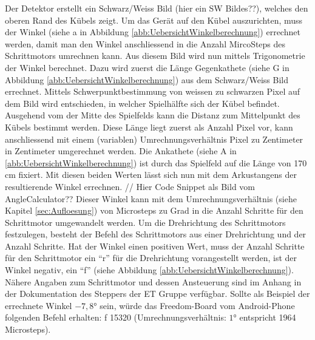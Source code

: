 Der Detektor erstellt ein Schwarz/Weiss Bild (hier ein SW Bildes??), welches den oberen Rand des Kübels zeigt. 
Um das Gerät auf den Kübel auszurichten, muss der Winkel (siehe a in Abbildung \ref{abb:UebersichtWinkelberechnung}) errechnet werden, 
damit man den Winkel anschliessend in die Anzahl MircoSteps des Schrittmotors umrechnen kann.
\newline
\newline
Aus diesem Bild wird nun mittels Trigonometrie der Winkel berechnet. 
Dazu wird zuerst die Länge Gegenkathete (siehe G in Abbildung \ref{abb:UebersichtWinkelberechnung}) 
aus dem Schwarz/Weiss Bild errechnet. Mittels Schwerpunktbestimmung von weissen zu schwarzen Pixel auf dem Bild wird entschieden, 
in welcher Spielhälfte sich der Kübel befindet. Ausgehend vom der Mitte des Spielfelds kann die Distanz zum Mittelpunkt des 
Kübels bestimmt werden. Diese Länge liegt zuerst als Anzahl Pixel vor, 
  kann anschliessend mit einem (variablen) Umrechnungsverhältnis Pixel zu Zentimeter in Zentimeter umgerechnet werden.
Die Ankathete (siehe A in \ref{abb:UebersichtWinkelberechnung}) ist durch das Spielfeld auf die Länge von 170 cm fixiert. 
Mit diesen beiden Werten lässt sich nun mit dem Arkustangens der resultierende Winkel errechnen.
\newline
\newline
// Hier Code Snippet als Bild vom AngleCalculator??
\newline
\newline
Dieser Winkel kann mit dem Umrechnungsverhältnis (siehe Kapitel \ref{sec:Aufloesung}) von Microsteps zu Grad 
in die Anzahl Schritte für den Schrittmotor umgewandelt werden. Um die Drehrichtung des Schrittmotors festzulegen, besteht der 
Befehl des Schrittmotors aus einer Drehrichtung und der Anzahl Schritte. Hat der Winkel einen positiven Wert, muss der Anzahl 
Schritte für den Schrittmotor ein  \enquote{r} für die Drehrichtung vorangestellt werden, ist der Winkel negativ, ein  \enquote{f} 
(siehe Abbildung \ref{abb:UebersichtWinkelberechnung}).  
\newline
\newline
Nähere Angaben zum Schrittmotor und dessen Ansteuerung sind im Anhang in der Dokumentation des Steppers der ET Gruppe verfügbar.
\newline
\newline
Sollte als Beispiel der errechnete Winkel $-7,8\si{\degree}$ sein, würde das Freedom-Board vom Android-Phone folgenden 
Befehl erhalten: f 15320 (Umrechnungsverhältnis: $1\si{\degree}$ entspricht 1964 Microsteps).
